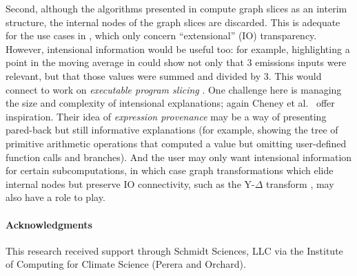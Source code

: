 Second, although the algorithms presented in  compute graph slices as an interim structure,
the internal nodes of the graph slices are discarded. This is adequate for the use cases in ,
which only concern ``extensional'' (IO) transparency. However, intensional information would be useful too:
for example, highlighting a point in the moving average in  could show not
only that 3 emissions inputs were relevant, but that those values were summed and divided by 3. This would
connect to work on \emph{executable program slicing} \cite{field98}. One challenge here is managing the size
and complexity of intensional explanations; again Cheney et al.~\cite{cheney11b} offer inspiration. Their idea
of \textit{expression provenance} may be a way of presenting pared-back but still informative explanations
(for example, showing the tree of primitive arithmetic operations that computed a value but omitting
user-defined function calls and branches). And the user may only want intensional information for certain
subcomputations, in which case graph transformations which elide internal nodes but preserve IO connectivity,
such as the Y-$\Delta$ transform \cite{truemper89}, may also have a role to play.

\paragraph{Acknowledgments}

This research received support through Schmidt Sciences, LLC via the Institute of Computing for Climate
Science (Perera and Orchard).
